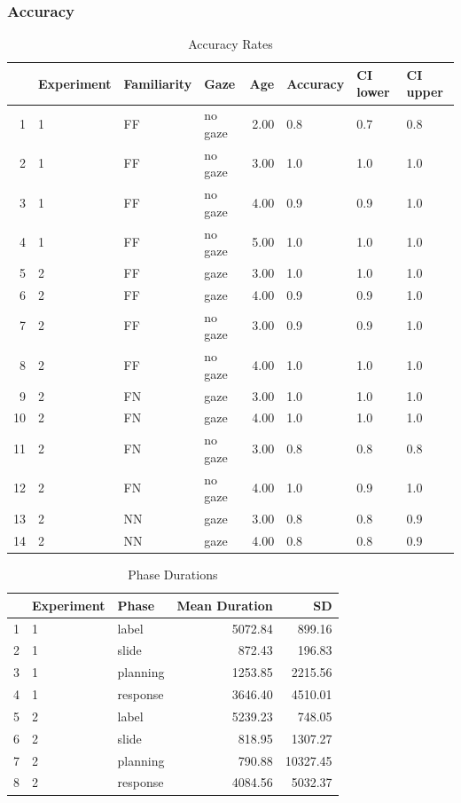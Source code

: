 \documentclass[a4paper,man,apacite,floatsintext]{apa6}
\begin{document}
\subsubsection{Accuracy}\label{accuracy}

\begin{table}[b]
\centering
\begin{tabular}{rlllrlll}
  \hline
 & Experiment & Familiarity & Gaze & Age & Accuracy & CI lower & CI upper \\ 
  \hline
1 & 1 & FF & no gaze & 2.00 & 0.8 & 0.7 & 0.8 \\ 
  2 & 1 & FF & no gaze & 3.00 & 1.0 & 1.0 & 1.0 \\ 
  3 & 1 & FF & no gaze & 4.00 & 0.9 & 0.9 & 1.0 \\ 
  4 & 1 & FF & no gaze & 5.00 & 1.0 & 1.0 & 1.0 \\ 
  5 & 2 & FF & gaze & 3.00 & 1.0 & 1.0 & 1.0 \\ 
  6 & 2 & FF & gaze & 4.00 & 0.9 & 0.9 & 1.0 \\ 
  7 & 2 & FF & no gaze & 3.00 & 0.9 & 0.9 & 1.0 \\ 
  8 & 2 & FF & no gaze & 4.00 & 1.0 & 1.0 & 1.0 \\ 
  9 & 2 & FN & gaze & 3.00 & 1.0 & 1.0 & 1.0 \\ 
  10 & 2 & FN & gaze & 4.00 & 1.0 & 1.0 & 1.0 \\ 
  11 & 2 & FN & no gaze & 3.00 & 0.8 & 0.8 & 0.8 \\ 
  12 & 2 & FN & no gaze & 4.00 & 1.0 & 0.9 & 1.0 \\ 
  13 & 2 & NN & gaze & 3.00 & 0.8 & 0.8 & 0.9 \\ 
  14 & 2 & NN & gaze & 4.00 & 0.8 & 0.8 & 0.9 \\ 
   \hline
\end{tabular}
\caption{Accuracy Rates} 
\label{tab:acc_table}
\end{table}

\begin{table}[b]
\centering
\begin{tabular}{rllrr}
  \hline
 & Experiment & Phase & Mean Duration & SD \\ 
  \hline
1 & 1 & label & 5072.84 & 899.16 \\ 
  2 & 1 & slide & 872.43 & 196.83 \\ 
  3 & 1 & planning & 1253.85 & 2215.56 \\ 
  4 & 1 & response & 3646.40 & 4510.01 \\ 
   \hline
5 & 2 & label & 5239.23 & 748.05 \\ 
  6 & 2 & slide & 818.95 & 1307.27 \\ 
  7 & 2 & planning & 790.88 & 10327.45 \\ 
  8 & 2 & response & 4084.56 & 5032.37 \\ 
   \hline
\end{tabular}
\caption{Phase Durations} 
\label{tab:phases}
\end{table}
\end{document}
